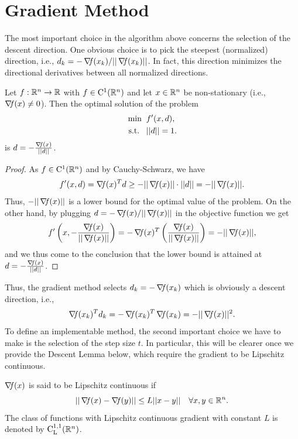 \documentclass[10pt,a4paper]{article}
\begin{document}
\section{Gradient Method}
\noindent The most important choice in the algorithm above concerns the selection of the descent direction. One obvious choice is to pick the steepest (normalized) direction, i.e., $d_k =-\operatorname*{\mathit{\nabla \!f}}(x_k)/||\operatorname*{\mathit{\nabla \!f}}(x_k)||$. In fact, this direction minimizes the directional derivatives between all normalized directions. 
\begin{lemma}
	Let $f:\mathbb{R}^n\to\mathbb{R}$ with $f\in\mathord{\mathrm{C^1}}(\mathbb{R}^n)$ and let $x\in\mathbb{R}^n$ be non-stationary (i.e., $\operatorname*{\mathit{\nabla \!f}}(x)\neq0$). Then the optimal solution of the problem
	\begin{equation*}
		\begin{split}
			\min \;\; &f'(x,d),\\
			\text{s.t.} \;\;\;& ||d||=1.
		\end{split}
	\end{equation*}
is $d=-\frac{\operatorname*{\mathit{\nabla \!f}}(x)}{||d||}$.
\end{lemma}
\begin{proof}
	As $f\in \mathord{\mathrm{C^1}}(\mathbb{R}^n)$ and by Cauchy-Schwarz, we have 
	\begin{equation*}
		f'(x,d)=\operatorname*{\mathit{\nabla \!f}}(x)^Td \geq -||\operatorname*{\mathit{\nabla \!f}}(x)||\cdot ||d|| = -||\operatorname*{\mathit{\nabla \!f}}(x)||.
	\end{equation*}
Thus, $-||\operatorname*{\mathit{\nabla \!f}}(x)||$ is a lower bound for the optimal value of the problem. On the other hand, by plugging  $d = -\operatorname*{\mathit{\nabla \!f}}(x)/||\operatorname*{\mathit{\nabla \!f}}(x)||$ in the objective function we get 
\begin{equation*}
	f'\left(x,-\frac{\operatorname*{\mathit{\nabla \!f}}(x)}{||\operatorname*{\mathit{\nabla \!f}}(x)||}\right)=-\operatorname*{\mathit{\nabla \!f}}(x)^T\left(\frac{\operatorname*{\mathit{\nabla \!f}}(x)}{||\operatorname*{\mathit{\nabla \!f}}(x)||}\right)= -||\operatorname*{\mathit{\nabla \!f}}(x)||,
\end{equation*}
and we thus come to the conclusion that the lower bound is attained at $d=-\frac{\operatorname*{\mathit{\nabla \!f}}(x)}{||d||}$.
\end{proof}
\noindent Thus, the gradient method selects $d_k = -\operatorname*{\mathit{\nabla \!f}}(x_k)$ which is obviously a descent direction, i.e., 
\begin{equation*}
\operatorname*{\mathit{\nabla \!f}}(x_k)^Td_k = -\operatorname*{\mathit{\nabla \!f}}(x_k)^T\operatorname*{\mathit{\nabla \!f}}(x_k) = -||\operatorname*{\mathit{\nabla \!f}}(x)||^2.
\end{equation*}
\noindent To define an implementable method, the second important choice we have to make is the selection of the step size $t$. In particular, this will be clearer once we provide the Descent Lemma below, which require the gradient to be Lipschitz continuous. 
\begin{definition}
	$\operatorname*{\mathit{\nabla \!f}}(x)$ is said to be Lipschitz continuous if 
	\begin{equation*}
		|| \operatorname*{\mathit{\nabla \!f}}(x) -\operatorname*{\mathit{\nabla \!f}}(y)|| \leq L ||x-y|| \quad \forall x,y \in \mathbb{R}^n.
	\end{equation*}
The class of functions with Lipschitz continuous gradient with constant $L$ is denoted by $\mathord{\mathrm{C^{1,1}_{L}}}(\mathbb{R}^n)$.
\end{definition}
\end{document}
